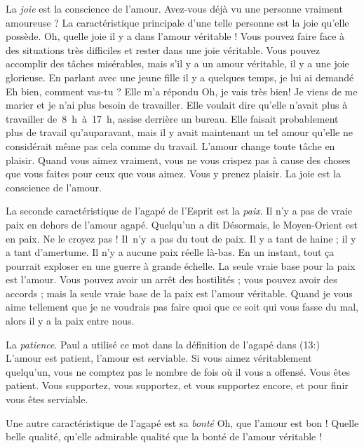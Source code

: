 La \emph{joie} est la conscience de l'amour.
 Avez-vous déjà vu une
 personne vraiment amoureuse ?
 La caractéristique principale d'une telle personne est la joie
 qu'elle possède. Oh, quelle joie il y a dans l'amour véritable !
 Vous pouvez faire face à des situations très difficiles
 et rester dans une joie véritable. Vous pouvez accomplir
 des tâches misérables, mais s'il y a un amour véritable,
 il y a une joie glorieuse. En parlant avec une jeune fille
 il y a quelques temps, je lui ai demandé\frcolon{}
 \Og Eh bien, comment vas-tu ? \Fg{} Elle m'a répondu\frcolon{}
 \Og Oh, je vais très bien! Je viens de me marier et je n'ai plus besoin
 de travailler. \Fg{}
 Elle voulait dire qu'elle n'avait plus à travailler de~8~h~à~17~h,
 assise derrière un bureau. Elle faisait probablement plus de travail
 qu'auparavant, mais il y avait maintenant un tel amour
 qu'elle ne considérait même pas cela comme du travail.
 L'amour change toute tâche en plaisir. Quand vous aimez vraiment,
 vous ne vous crispez pas à cause des choses que vous faites
 pour ceux que vous aimez. Vous y prenez plaisir.
 La joie est la conscience de l'amour.

La seconde caractéristique de l'agapé de l'Esprit est la \emph{paix}.
 Il n'y a pas de vraie paix en dehors de l'amour agapé.
 Quelqu'un a dit\frcolon{} \Og Désormais, le Moyen-Orient est en paix. \Fg{}
 Ne le croyez pas ! Il~n'y~a pas du tout de paix.
 Il y a tant de haine ; il y a tant d'amertume.
 Il n'y a aucune paix réelle là-bas. En un instant, tout ça pourrait
 exploser en une guerre à grande échelle.
 La seule vraie base pour la paix est l'amour.
 Vous pouvez avoir un arrêt des hostilités ; vous pouvez avoir des accords ;
 mais la seule vraie base de la paix est l'amour véritable.
 Quand je vous aime tellement que je ne voudrais pas faire
 quoi que ce soit qui vous fasse du mal, alors il y a la paix entre nous.

La \emph{patience}. Paul a utilisé ce mot dans la définition de l'agapé
 dans (13:)\frcolon{}
 \Og L'amour est patient, l'amour est serviable. \Fg{}
 Si vous aimez véritablement quelqu'un, vous ne comptez pas
 le nombre de fois où il vous a offensé. Vous êtes patient.
 Vous supportez, vous supportez, et vous supportez encore,
 et pour finir vous êtes serviable.

Une autre caractéristique de l'agapé est sa \emph{bonté}\frcolon{}
 Oh, que l'amour est bon ! Quelle belle qualité,
 qu'elle admirable qualité que la bonté de l'amour véritable !

